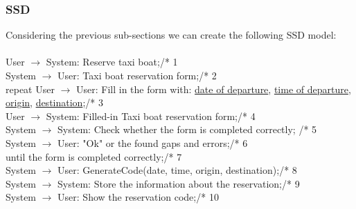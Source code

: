 \subsubsection{SSD}
\creator{\studentA}
Considering the previous sub-sections we can create the following SSD model:\\\\
User $\rightarrow$ System: Reserve taxi boat;\hfill /* 1\\
System $\rightarrow$ User: Taxi boat reservation form;\hfill /* 2\\
repeat User $\rightarrow$ User: Fill in the form with: \underline{date of departure}, \underline{time of departure},\\ \underline{origin}, \underline{destination};\hfill /* 3\\
\phantom{x}\hspace{7mm} User $\rightarrow$ System: Filled-in Taxi boat reservation form;\hfill /* 4\\
\phantom{x}\hspace{7mm} System $\rightarrow$ System: Check whether the form is completed correctly; \hfill /* 5\\
\phantom{x}\hspace{7mm} System $\rightarrow$ User: "Ok" or the found gaps and errors;\hfill /* 6\\
until the form is completed correctly;\hfill /* 7\\
System $\rightarrow$ User: GenerateCode(date, time, origin, destination);\hfill /* 8\\
System $\rightarrow$ System: Store the information about the reservation;\hfill /* 9\\
System $\rightarrow$ User: Show the reservation code;\hfill /* 10\\

